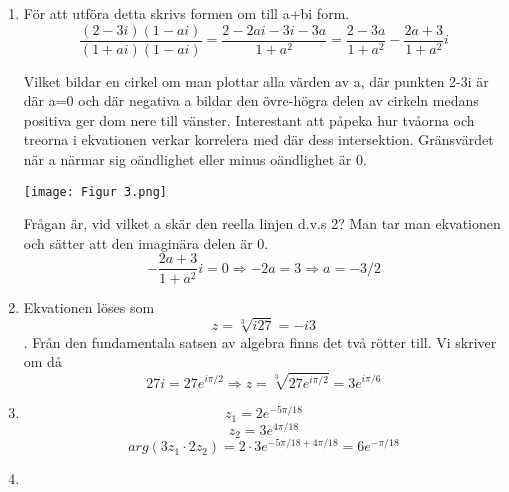 \documentclass[a4paper,12pt]{article}
\begin{document}
\begin{enumerate}
          \item För att utföra detta skrivs formen om till a+bi form.
          $$\frac{(2-3i)(1-ai)}{(1+ai)(1-ai)}=\frac{2-2ai-3i-3a}{1+a^2}=\frac{2-3a}{1+a^2}-\frac{2a+3}{1+a^2}i$$

          Vilket bildar en cirkel om man plottar alla värden av a, där punkten
          2-3i är där a=0 och där negativa a bildar den övre-högra delen av cirkeln
          medans positiva ger dom nere till vänster.
          Interestant att påpeka hur tvåorna och treorna i ekvationen
          verkar korrelera med där dess intersektion. Gränsvärdet
          när a närmar sig oändlighet eller minus oändlighet är 0.
          \begin{center}
                \texttt{[image: Figur 3.png]}
          \end{center}

          Frågan är, vid vilket a skär den reella linjen d.v.s 2?
          Man tar man ekvationen och sätter att den imaginära delen är 0.
          $$-\frac{2a+3}{1+a^2}i=0\Rightarrow -2a=3\Rightarrow a=-3/2$$

          \item 
          Ekvationen löses som $$z=\sqrt[3]{i27}=-i3$$.
          Från den fundamentala satsen av algebra finns det två rötter till.
          Vi skriver om då 
          $$27i=27e^{i\pi/2}\Rightarrow z=\sqrt[3]{27e^{i\pi/2}}=3e^{i\pi/6}$$
          
          \item $$z_1=2e^{-5\pi/18}$$
            $$z_2=3e^{4\pi/18}$$
          $$arg(3z_1\cdot 2z_2)=2\cdot 3e^{-5\pi/18+4\pi/18}=6e^{-\pi/18}$$

          \item 
\end{enumerate}
\end{document}

